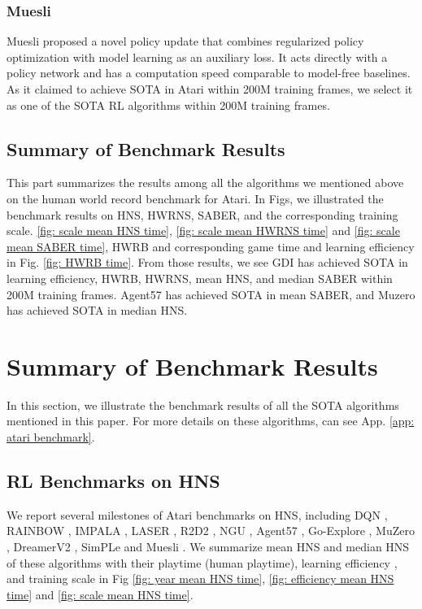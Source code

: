 \documentclass[nohyperref]{article}
\theoremstyle{plain}
\begin{document}
\subsubsection{Muesli}
Muesli \citep{muesli} proposed a novel policy update that combines regularized policy optimization with model learning as an auxiliary loss. It acts directly with a policy network and has a computation speed comparable to model-free baselines. As it claimed to achieve SOTA in Atari within 200M training frames, we select it as one of the SOTA  RL algorithms within 200M training frames.





\subsection{Summary of Benchmark Results}
This part summarizes the results among all the algorithms we mentioned above on the human world record benchmark for Atari. In Figs, we illustrated the benchmark results on HNS, HWRNS, SABER, and the corresponding training scale. \ref{fig: scale mean HNS time}, \ref{fig: scale mean HWRNS time} and \ref{fig: scale mean SABER time}, HWRB and corresponding game time  and learning efficiency in Fig. \ref{fig: HWRB time}. From those results, we see GDI  has achieved SOTA in learning efficiency, HWRB, HWRNS, mean HNS, and median SABER within 200M training frames. Agent57 has achieved SOTA in mean SABER, and Muzero \citep{muzero} has achieved SOTA in median HNS.


\clearpage
\section{Summary of Benchmark Results}
\label{app: Summary of Benchmark Results}

In this section, we illustrate the benchmark results of all the SOTA algorithms mentioned in this paper. For more details on these algorithms, can see App. \ref{app: atari benchmark}.



\subsection{RL Benchmarks on HNS}
\label{app: RL Benchmarks on HNS}
We report several milestones of Atari benchmarks on HNS, including DQN \citep{dqn}, RAINBOW \citep{rainbow}, IMPALA \citep{impala}, LASER \citep{laser}, R2D2 \citep{r2d2}, NGU \citep{ngu}, Agent57 \citep{agent57}, Go-Explore \citep{goexplore}, MuZero \citep{muzero}, DreamerV2 \citep{dreamerv2}, SimPLe \citep{modelbasedatari} and Muesli \citep{muesli}. We summarize mean HNS and median HNS of these algorithms  with their playtime (human playtime), learning efficiency , and training scale in Fig \ref{fig: year mean HNS time}, \ref{fig: efficiency mean HNS time} and \ref{fig: scale mean HNS time}.
\end{document}
